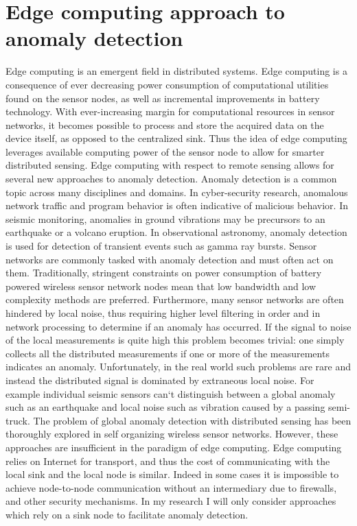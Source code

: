 \section{Edge computing approach to anomaly detection}\label{intro:edge}
Edge computing is an emergent field in distributed systems. Edge computing is a consequence of ever decreasing power consumption of computational utilities found on the sensor nodes, as well as incremental improvements in battery technology. With ever-increasing margin for computational resources in sensor networks, it becomes possible to process and store the acquired data on the device itself, as opposed to the centralized sink. Thus the idea of edge computing leverages available computing power of the sensor node to allow for smarter distributed sensing. Edge computing with respect to remote sensing allows for several new approaches to anomaly detection. Anomaly detection is a common topic across many disciplines and domains. In cyber-security research, anomalous network traffic and program behavior is often indicative of malicious behavior. In seismic monitoring, anomalies in ground vibrations may be precursors to an earthquake or a volcano eruption. In observational astronomy, anomaly detection is used for detection of transient events such as gamma ray bursts. Sensor networks are commonly tasked with anomaly detection and must often act on them. Traditionally, stringent constraints on power consumption of battery powered wireless sensor network nodes mean that low bandwidth and low complexity methods are preferred. Furthermore, many sensor networks are often hindered by local noise, thus requiring higher level filtering in order and in network processing to determine if an anomaly has occurred. If the signal to noise of the local measurements is quite high this problem becomes trivial: one simply collects all the distributed measurements if one or more of the measurements indicates an anomaly. Unfortunately, in the real world such problems are rare and instead the distributed signal is dominated by extraneous local noise. For example individual seismic sensors can`t distinguish between a global anomaly such as an earthquake and local noise such as vibration caused by a passing semi-truck. The problem of global anomaly detection with distributed sensing has been thoroughly explored in self organizing wireless sensor networks. However, these approaches are insufficient in the paradigm of edge computing. Edge computing relies on Internet for transport, and thus the cost of communicating with the local sink and the local node is similar. Indeed in some cases it is impossible to achieve node-to-node communication without an intermediary due to firewalls, and other security mechanisms. In my research I will only consider approaches which rely on a sink node to facilitate anomaly detection.

